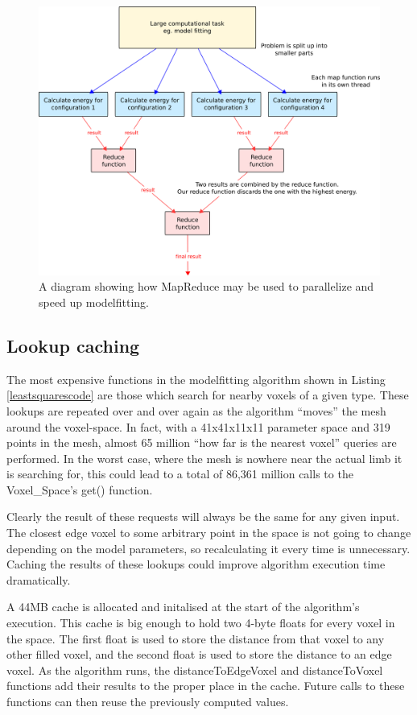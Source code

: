 \begin{figure}[tb]
	\centering
	\includegraphics[width=\textwidth]{mapreduce.png}
	\caption{A diagram showing how MapReduce may be used to parallelize and speed up modelfitting.}
	\label{MapReduceDiagram}
\end{figure}

\subsection{Lookup caching}
\label{Optimisations:LookupCache}

The most expensive functions in the modelfitting algorithm shown in Listing \ref{leastsquarescode} are those which search for nearby voxels of a given type.
These lookups are repeated over and over again as the algorithm ``moves'' the mesh around the voxel-space.
In fact, with a 41x41x11x11 parameter space and 319 points in the mesh, almost 65 million ``how far is the nearest voxel'' queries are performed.
In the worst case, where the mesh is nowhere near the actual limb it is searching for, this could lead to a total of 86,361 million calls to the Voxel\_Space's get() function.

Clearly the result of these requests will always be the same for any given input.
The closest edge voxel to some arbitrary point in the space is not going to change depending on the model parameters, so recalculating it every time is unnecessary.
Caching the results of these lookups could improve algorithm execution time dramatically.

A 44MB cache is allocated and initalised at the start of the algorithm's execution.
This cache is big enough to hold two 4-byte floats for every voxel in the space.
The first float is used to store the distance from that voxel to any other filled voxel, and the second float is used to store the distance to an edge voxel.
As the algorithm runs, the distanceToEdgeVoxel and distanceToVoxel functions add their results to the proper place in the cache.
Future calls to these functions can then reuse the previously computed values.

